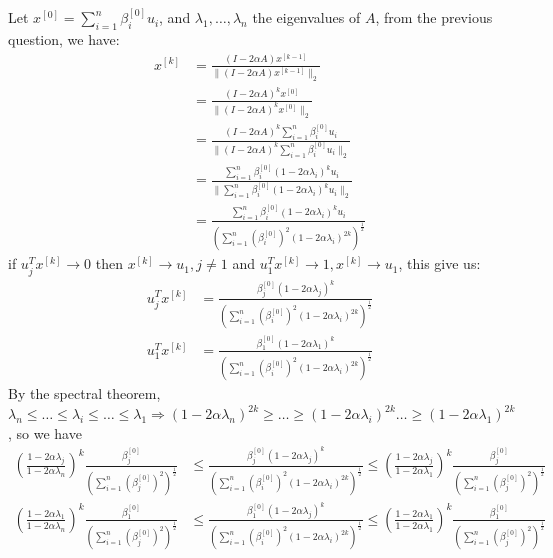 \documentclass[12pt,twoside]{article}
\begin{document}
\begin{enumerate}
\begin{enumerate}
Let $x^{[0]} = \sum_{i=1}^n \beta_i^{[0]} u_i$,  and $\lambda_1, \dots , \lambda_n$ the eigenvalues of $A$, from the previous question, we have:
\begin{align*}
	x^{[k]}	&=	\frac{(I - 2 \alpha A)  x^{[k-1]}} { \| (I - 2 \alpha A)  x^{[k-1]} \|_2} \\
			&=	\frac{(I - 2 \alpha A)^k x^{[0]}} { \| (I - 2 \alpha A)^k x^{[0]} \|_2 } \\
			&= 	\frac{(I - 2 \alpha A)^k \sum_{i=1}^n \beta_i^{[0]} u_i} { \| (I - 2 \alpha A)^k \sum_{i=1}^n \beta_i^{[0]} u_i \|_2} \\
			&=	\frac{\sum_{i=1}^n \beta_i^{[0]} (1 - 2 \alpha \lambda_i)^k u_i} { \| \sum_{i=1}^n \beta_i^{[0]} (1 - 2 \alpha \lambda_i)^k u_i \|_2} \\
			&= 	\frac{\sum_{i=1}^n \beta_i^{[0]} (1 - 2 \alpha \lambda_i)^k u_i} { (\sum_{i=1}^n (\beta_i^{[0]})^2 (1 - 2 \alpha \lambda_i)^{2k} )^{\frac{1}{2}} }
\end{align*}
if $u_j^T x^{[k]} \to 0$ then $x^{[k]} \to u_1,  j \neq 1$ and $u_1^T x^{[k]} \to 1, x^{[k]} \to u_1$, this give us:
\begin{align*}
	u_j^T x^{[k]}	&=	\frac{ \beta_j^{[0]} (1 - 2 \alpha \lambda_j)^k }  { (\sum_{i=1}^n (\beta_i^{[0]})^2 (1 - 2 \alpha \lambda_i)^{2k} )^{\frac{1}{2}} } \\
	u_1^T x^{[k]}	&=	\frac{ \beta_1^{[0]} (1 - 2 \alpha \lambda_1)^k }  { (\sum_{i=1}^n (\beta_i^{[0]})^2 (1 - 2 \alpha \lambda_i)^{2k} )^{\frac{1}{2}} } 
\end{align*}
By the spectral theorem, $\lambda_n \le \dots \le \lambda_i \le \ldots \le \lambda_1 \Rightarrow (1-2 \alpha \lambda_n)^{2k} \ge \ldots \ge (1-2 \alpha \lambda_i)^{2k} \ldots \ge (1-2 \alpha \lambda_1)^{2k}$, so we have
\begin{align*}
	(\frac{1-2 \alpha \lambda_j}{1-2 \alpha \lambda_n})^k \frac{\beta_j^{[0]}} {(\sum_{i=1}^n (\beta_j^{[0]})^2)^{\frac{1}{2}}} 
		&\le \frac{ \beta_j^{[0]} (1 - 2 \alpha \lambda_j)^k }  { (\sum_{i=1}^n (\beta_i^{[0]})^2 (1 - 2 \alpha \lambda_i)^{2k} )^{\frac{1}{2}} } 
		\le (\frac{1-2 \alpha \lambda_j}{1-2 \alpha \lambda_1})^k \frac{\beta_j^{[0]}} {(\sum_{i=1}^n (\beta_j^{[0]})^2)^{\frac{1}{2}}} \\
	(\frac{1-2 \alpha \lambda_1}{1-2 \alpha \lambda_n})^k \frac{\beta_1^{[0]}} {(\sum_{i=1}^n (\beta_j^{[0]})^2)^{\frac{1}{2}}} 
		&\le \frac{ \beta_1^{[0]} (1 - 2 \alpha \lambda_j)^k }  { (\sum_{i=1}^n (\beta_i^{[0]})^2 (1 - 2 \alpha \lambda_i)^{2k} )^{\frac{1}{2}} } 
		\le (\frac{1-2 \alpha \lambda_1}{1-2 \alpha \lambda_1})^k \frac{\beta_1^{[0]}} {(\sum_{i=1}^n (\beta_j^{[0]})^2)^{\frac{1}{2}}} \\

\end{align*}
\end{enumerate}
\end{enumerate}
\end{document}
